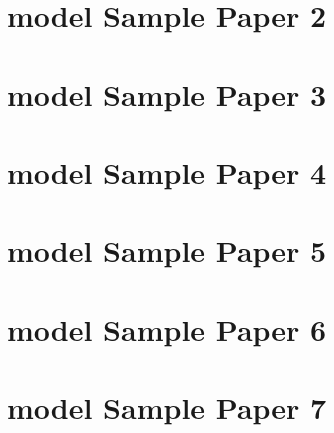\documentclass[
  letterpaper,
  DIV=11,
  numbers=noendperiod]{scrreprt}
\begin{document}

\hypertarget{model-sample-paper-2-1}{%
\section*{model Sample Paper 2}\label{model-sample-paper-2-1}}


\hypertarget{model-sample-paper-3-1}{%
\section*{model Sample Paper 3}\label{model-sample-paper-3-1}}


\hypertarget{model-sample-paper-4-1}{%
\section*{model Sample Paper 4}\label{model-sample-paper-4-1}}


\hypertarget{model-sample-paper-5-1}{%
\section*{model Sample Paper 5}\label{model-sample-paper-5-1}}


\hypertarget{model-sample-paper-6-1}{%
\section*{model Sample Paper 6}\label{model-sample-paper-6-1}}


\hypertarget{model-sample-paper-7-1}{%
\section*{model Sample Paper 7}\label{model-sample-paper-7-1}}

\end{document}
